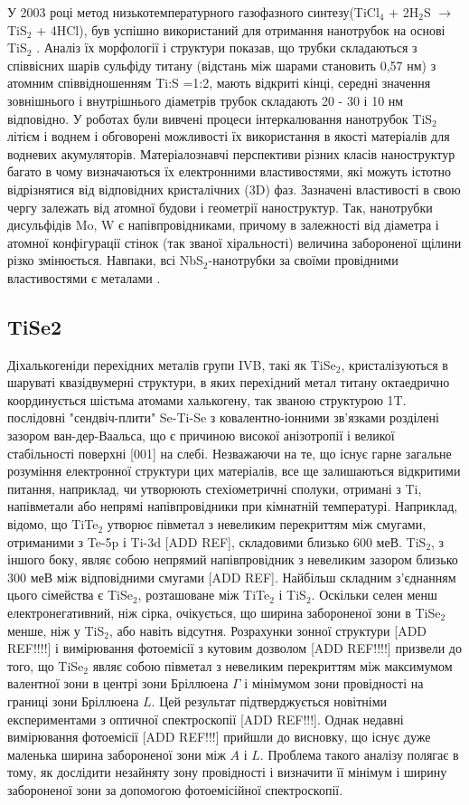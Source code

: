 У 2003 році метод низькотемпературного газофазного синтезу(TiCl$_4$ + 2H$_2$S $\rightarrow$ TiS$_2$ + 4HCl), був успішно використаний для отримання нанотрубок на основі TiS$_2$ \cite{nanotube}. Аналіз їх морфології і структури показав, що трубки складаються з співвісних шарів сульфіду титану (відстань між шарами становить 0,57 нм) з атомним співвідношенням Ti:S =1:2, мають відкриті кінці, середні значення зовнішнього і внутрішнього діаметрів трубок складають  20 - 30 і  10 нм відповідно. У роботах \cite{nanotube2,nanotube3} були вивчені процеси інтеркалювання нанотрубок TiS$_2$ літієм і воднем і обговорені можливості їх використання в якості матеріалів для водневих акумуляторів. Матеріалознавчі перспективи різних класів наноструктур багато в чому визначаються їх електронними властивостями, які можуть істотно відрізнятися від відповідних кристалічних (3D) фаз. Зазначені властивості в свою чергу залежать від атомної будови і геометрії наноструктур. Так, нанотрубки дисульфідів Mo, W є напівпровідниками, причому в залежності від діаметра і атомної конфігурації стінок (так званої хіральності) величина забороненої щілини різко змінюється. Навпаки, всі NbS$_2$-нанотрубки за своїми провідними властивостями є металами \cite{nanotube4,nanotube5,nanotube6}.
\subsection{TiSe2}
Діхалькогеніди перехідних металів групи IVB, такі як TiSe$_2$, кристалізуються в шаруваті квазідвумерні структури, в яких перехідний метал титану октаедрично координується шістьма атомами халькогену, так званою структурою 1T. послідовні "сендвіч-плити" Se-Ti-Se з ковалентно-іонними зв'язками розділені зазором ван-дер-Ваальса, що є причиною високої анізотропії і великої стабільності поверхні [001] на слебі. Незважаючи на те, що існує гарне загальне розуміння електронної структури цих матеріалів, все ще залишаються відкритими питання, наприклад, чи утворюють стехіометричні сполуки, отримані з Ti, напівметали або непрямі напівпровідники при кімнатній температурі. Наприклад, відомо, що TiTe$_2$ утворює півметал з невеликим перекриттям між смугами, отриманими з Te-5p і Ti-3d [ADD REF], складовими близько 600 $меВ$. TiS$_2$, з іншого боку, являє собою непрямий напівпровідник з невеликим зазором близько 300 $меВ$ між відповідними смугами [ADD REF]. Найбільш складним з'єднанням цього сімейства є TiSe$_2$, розташоване між TiTe$_2$ і TiS$_2$. Оскільки селен менш електронегативний, ніж сірка, очікується, що ширина забороненої зони в TiSe$_2$ менше, ніж у TiS$_2$, або навіть відсутня. Розрахунки зонної структури [ADD REF!!!!] і вимірювання фотоемісії з кутовим дозволом [ADD REF!!!!] призвели до того, що TiSe$_2$ являє собою півметал з невеликим перекриттям між максимумом валентної зони в центрі зони Бріллюена $\Gamma$ і мінімумом зони провідності на границі зони Бріллюена $L$. Цей результат підтверджується новітніми експериментами з оптичної спектроскопії [ADD REF!!!]. Однак недавні вимірювання фотоемісії [ADD REF!!!] прийшли до висновку, що існує дуже маленька ширина забороненої зони між $A$ і $L$. Проблема такого аналізу полягає в тому, як дослідити незайняту зону провідності і визначити її мінімум і ширину забороненої зони за допомогою фотоемісійної спектроскопії.

